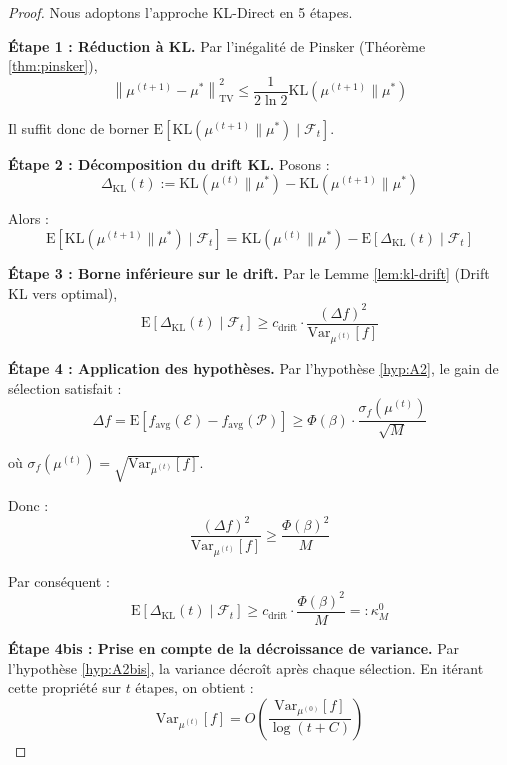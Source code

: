 \documentclass[12pt,a4paper]{article}
\theoremstyle{definition}
\theoremstyle{remark}
\newcommand{\E}{\text{E}}
\newcommand{\Var}{\text{Var}}
\newcommand{\KL}{\text{KL}}
\newcommand{\TV}{\text{TV}}
\newcommand{\norm}[1]{\left\|#1\right\|}
\begin{document}
	\begin{proof}
		Nous adoptons l'approche KL-Direct en 5 étapes.
		
		\textbf{Étape 1 : Réduction à KL.}
		Par l'inégalité de Pinsker (Théorème \ref{thm:pinsker}),
		\begin{equation}
			\norm{\mu^{(t+1)} - \mu^*}_{\TV}^2 \leq \frac{1}{2\ln 2} \KL(\mu^{(t+1)}\|\mu^*)
		\end{equation}
		
		Il suffit donc de borner $\E[\KL(\mu^{(t+1)}\|\mu^*) \mid \mathcal{F}_t]$.
		
		\textbf{Étape 2 : Décomposition du drift KL.}
		Posons :
		\begin{equation}
			\Delta_{\KL}(t) := \KL(\mu^{(t)}\|\mu^*) - \KL(\mu^{(t+1)}\|\mu^*)
		\end{equation}
		
		Alors :
		\begin{equation}
			\E[\KL(\mu^{(t+1)}\|\mu^*) \mid \mathcal{F}_t] = \KL(\mu^{(t)}\|\mu^*) - \E[\Delta_{\KL}(t) \mid \mathcal{F}_t]
		\end{equation}
		
		\textbf{Étape 3 : Borne inférieure sur le drift.}
		Par le Lemme \ref{lem:kl-drift} (Drift KL vers optimal),
		\begin{equation}
			\E[\Delta_{\KL}(t) \mid \mathcal{F}_t] \geq c_{\text{drift}} \cdot \frac{(\Delta f)^2}{\Var_{\mu^{(t)}}[f]}
		\end{equation}
		
		\textbf{Étape 4 : Application des hypothèses.}
		Par l'hypothèse \ref{hyp:A2}, le gain de sélection satisfait :
		\begin{equation}
			\Delta f = \E[f_{\text{avg}}(\mathcal{E}) - f_{\text{avg}}(\mathcal{P})] \geq \Phi(\beta) \cdot \frac{\sigma_f(\mu^{(t)})}{\sqrt{M}}
		\end{equation}
		
		où $\sigma_f(\mu^{(t)}) = \sqrt{\Var_{\mu^{(t)}}[f]}$.
		
		Donc :
		\begin{equation}
			\frac{(\Delta f)^2}{\Var_{\mu^{(t)}}[f]} \geq \frac{\Phi(\beta)^2}{M}
		\end{equation}
		
		Par conséquent :
		\begin{equation}
			\E[\Delta_{\KL}(t) \mid \mathcal{F}_t] \geq c_{\text{drift}} \cdot \frac{\Phi(\beta)^2}{M} =: \kappa_M^0
		\end{equation}
		
		\textbf{Étape 4bis : Prise en compte de la décroissance de variance.}
		Par l'hypothèse \ref{hyp:A2bis}, la variance décroît après chaque sélection. En itérant cette propriété sur $t$ étapes, on obtient :
		\begin{equation}
			\Var_{\mu^{(t)}}[f] = O\left(\frac{\Var_{\mu^{(0)}}[f]}{\log(t+C)}\right)
		\end{equation}
		

\end{proof}
\end{document}
